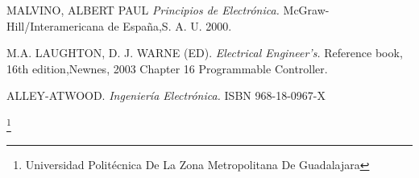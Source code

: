 \documentclass[10pt,a4paper]{article}
\begin{document}

\begin{thebibliography}{X}
 \textsc{MALVINO, ALBERT PAUL} \textit{Principios de Electrónica.} McGraw-Hill/Interamericana de España,S. A. U. 2000.

 \textsc{M.A. LAUGHTON, D. J. WARNE (ED).} \textit{Electrical Engineer's.} 
Reference book, 16th edition,Newnes, 2003 Chapter 16 Programmable Controller.


 \textsc{ALLEY-ATWOOD.} \textit{Ingeniería Electrónica.} 
ISBN 968-18-0967-X
\end{thebibliography}


\footnote{Universidad Politécnica De La Zona Metropolitana De Guadalajara}
\end{document}
